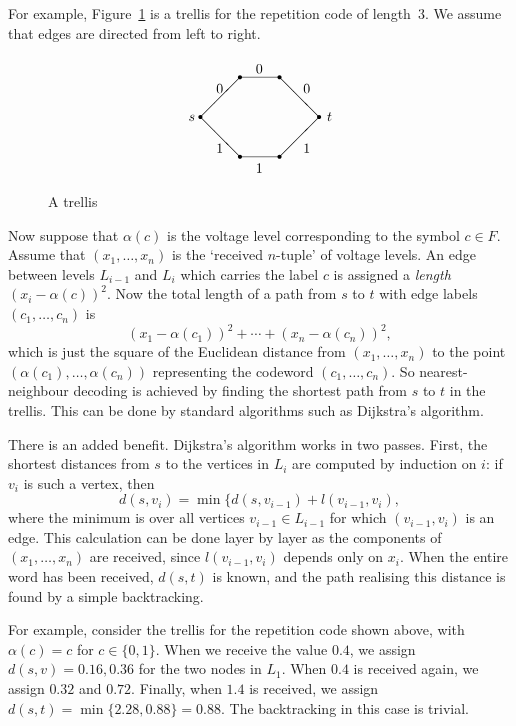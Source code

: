 \documentclass[12pt]{article}
\begin{document}
For example, Figure~\ref{f:rep} is a trellis for the repetition code of
length~$3$. We assume that edges are directed from left to right.
\begin{figure}[htb]
\[\setlength{\unitlength}{1mm}
\begin{picture}(40,30)
\multiput(5,15)(30,0){2}{\circle*{1}}
\multiput(15,25)(10,0){2}{\circle*{1}}
\multiput(15,5)(10,0){2}{\circle*{1}}
\multiput(15,5)(0,20){2}{\line(1,0){10}}
\multiput(5,15)(20,-10){2}{\line(1,1){10}}
\multiput(5,15)(20,10){2}{\line(1,-1){10}}
\put(9,21){$0$}
\put(19,26){$0$}
\put(31,21){$0$}
\put(9,6){$1$}
\put(19,1){$1$}
\put(31,6){$1$}
\put(2,14){$s$}
\put(37,14){$t$}
\end{picture}\]
\caption{A trellis}
\label{f:rep}
\end{figure}

Now suppose that $\alpha(c)$ is the voltage level corresponding
to the symbol $c\in F$. Assume that $(x_1, \ldots, x_n)$ is the
`received $n$-tuple' of voltage levels. An edge between levels
$L_{i-1}$ and $L_i$ which carries the label $c$ is assigned a
\emph{length} $(x_i-\alpha(c))^2$. Now the total length of a
path from $s$ to $t$ with edge labels $(c_1,\ldots, c_n)$ is
\[(x_1-\alpha(c_1))^2+\cdots+(x_n-\alpha(c_n))^2,\]
which is just the square of the Euclidean distance from
$(x_1, \ldots, x_n)$ to the point $(\alpha(c_1),\ldots,\alpha(c_n))$
representing the codeword $(c_1,\ldots, c_n)$. So nearest-neighbour
decoding is achieved by finding the shortest path from $s$ to $t$
in the trellis. This can be done by standard algorithms such as
Dijkstra's algorithm.

There is an added benefit. Dijkstra's algorithm works in two
passes. First, the shortest distances from $s$ to the vertices
in $L_i$ are computed by induction on $i$: if $v_i$ is such
a vertex, then
\[d(s,v_i)=\min\{d(s,v_{i-1})+l(v_{i-1},v_i),\]
where the minimum is over all vertices $v_{i-1}\in L_{i-1}$
for which $(v_{i-1},v_i)$ is an edge. This calculation can be
done layer by layer as the components of $(x_1, \ldots, x_n)$
are received, since $l(v_{i-1},v_i)$ depends only on $x_i$. When
the entire word has been received, $d(s,t)$ is known, and the
path realising this distance is found by a simple backtracking.

For example, consider the trellis for the repetition code shown
above, with $\alpha(c)=c$ for $c\in\{0,1\}$. When we receive the
value $0.4$, we assign $d(s,v)=0.16,0.36$ for the two nodes in
$L_1$. When $0.4$ is received again, we assign $0.32$ and $0.72$.
Finally, when $1.4$ is received, we assign
$d(s,t)=\min\{2.28,0.88\}=0.88$. The backtracking in this case
is trivial.
\end{document}
